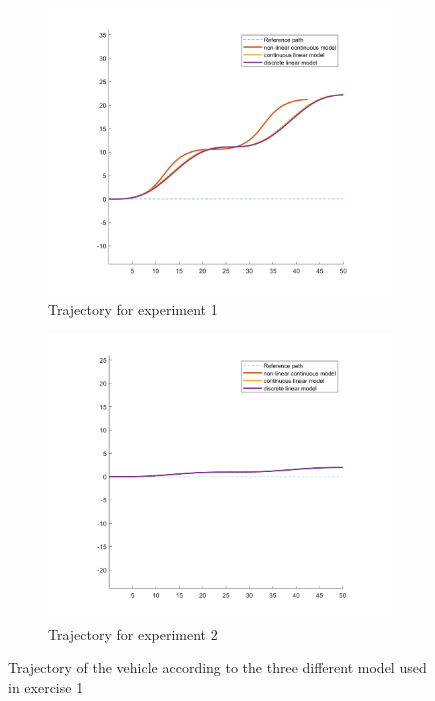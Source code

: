 \begin{figure}[H]
    \centering
     \begin{subfigure}[b]{0.45\textwidth}
         \centering
         \includegraphics[width=\textwidth]{Latex report/image/ex1/trajectory1.png}
         \caption{Trajectory for experiment 1}
         \label{fig:traj11}
     \end{subfigure}
     \begin{subfigure}[b]{0.45\textwidth}
         \centering
         \includegraphics[width=\textwidth]{Latex report/image/ex1/trajectory2.png}
         \caption{Trajectory for experiment 2}
         \label{fig:traj12}
     \end{subfigure}
    \caption{Trajectory of the vehicle according to the three different model used in exercise 1}
    \label{fig:trajEx1}
\end{figure}

